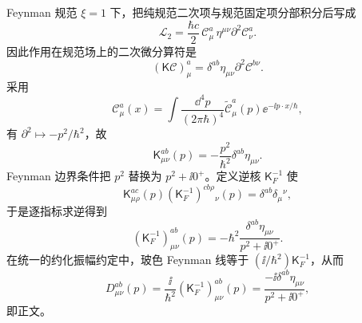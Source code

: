 \begin{derivation}[三胶子顶角的动量与颜色结构]
Feynman 规范 $\xi=1$ 下，把纯规范二次项与规范固定项分部积分后写成
\begin{equation*}
 \mathcal L_2
 =\frac{\hbar c}{2}\,
 \mathscr C_\mu^a\,\eta^{\mu\nu}\partial^2\mathscr C_\nu^a .
\end{equation*}
因此作用在规范场上的二次微分算符是
\begin{equation*}
 (\mathsf K\mathscr C)_\mu^a
 =\delta^{ab}\eta_{\mu\nu}\partial^2\mathscr C^{b\nu}.
\end{equation*}
采用
\begin{equation*}
 \mathscr C_\mu^a(x)
 =\int\frac{\dd^4p}{(2\pi\hbar)^4}
 \widetilde{\mathscr C}_\mu^a(p)
 \ee^{-\ii p\cdot x/\hbar},
\end{equation*}
有 $\partial^2\mapsto-p^2/\hbar^2$，故
\begin{equation*}
 \mathsf K_{\mu\nu}^{ab}(p)
 =-\frac{p^2}{\hbar^2}\delta^{ab}\eta_{\mu\nu}.
\end{equation*}
Feynman 边界条件把 $p^2$ 替换为 $p^2+\ii0^+$。定义逆核 $\mathsf K_F^{-1}$ 使
\begin{equation*}
 \mathsf K_{\mu\rho}^{ac}(p)
 (\mathsf K_F^{-1})^{cb\rho}{}_{\nu}(p)
 =\delta^{ab}\delta_\mu{}^\nu,
\end{equation*}
于是逐指标求逆得到
\begin{equation*}
 (\mathsf K_F^{-1})_{\mu\nu}^{ab}(p)
 =-\hbar^2\frac{\delta^{ab}\eta_{\mu\nu}}{p^2+\ii0^+}.
\end{equation*}
在统一的约化振幅约定中，玻色 Feynman 线等于 $(\ii/\hbar^2)\mathsf K_F^{-1}$，从而
\begin{equation*}
 D_{\mu\nu}^{ab}(p)
 =\frac{\ii}{\hbar^2}(\mathsf K_F^{-1})_{\mu\nu}^{ab}(p)
 =\frac{-\ii\delta^{ab}\eta_{\mu\nu}}{p^2+\ii0^+},
\end{equation*}
即正文。


\end{derivation}

